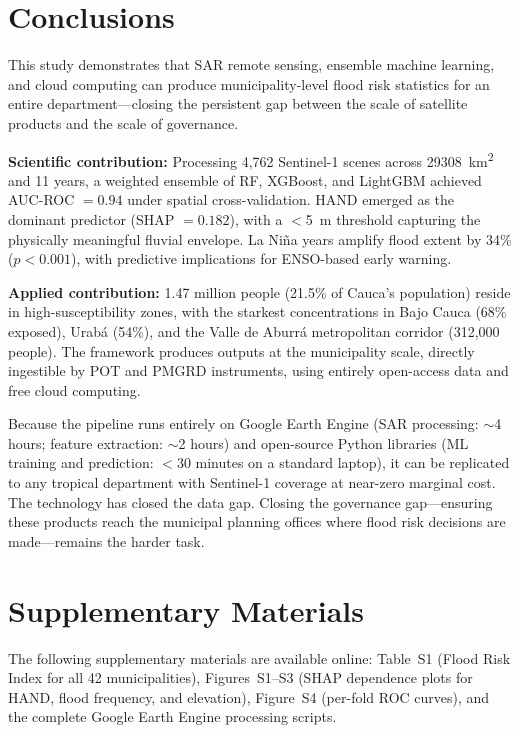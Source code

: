 \documentclass{article}
\begin{document}
\section{Conclusions}
\label{sec:conclusions}

This study demonstrates that SAR remote sensing, ensemble machine learning, and cloud computing can produce municipality-level flood risk statistics for an entire department---closing the persistent gap between the scale of satellite products and the scale of governance.

\textbf{Scientific contribution:} Processing 4,762 Sentinel-1 scenes across \SI{29308}{\kilo\metre\squared} and 11 years, a weighted ensemble of RF, XGBoost, and LightGBM achieved AUC-ROC $= 0.94$ under spatial cross-validation. HAND emerged as the dominant predictor (SHAP $= 0.182$), with a $<$\SI{5}{\metre} threshold capturing the physically meaningful fluvial envelope. La Ni\~na years amplify flood extent by 34\% ($p < 0.001$), with predictive implications for ENSO-based early warning.

\textbf{Applied contribution:} 1.47 million people (21.5\% of Cauca's population) reside in high-susceptibility zones, with the starkest concentrations in Bajo Cauca (68\% exposed), Urab\'a (54\%), and the Valle de Aburr\'a metropolitan corridor (312,000 people). The framework produces outputs at the municipality scale, directly ingestible by POT and PMGRD instruments, using entirely open-access data and free cloud computing.

Because the pipeline runs entirely on Google Earth Engine (SAR processing: $\sim$4 hours; feature extraction: $\sim$2 hours) and open-source Python libraries (ML training and prediction: $<$30 minutes on a standard laptop), it can be replicated to any tropical department with Sentinel-1 coverage at near-zero marginal cost. The technology has closed the data gap. Closing the governance gap---ensuring these products reach the municipal planning offices where flood risk decisions are made---remains the harder task.

\section*{Supplementary Materials}

The following supplementary materials are available online: Table~S1 (Flood Risk Index for all 42 municipalities), Figures~S1--S3 (SHAP dependence plots for HAND, flood frequency, and elevation), Figure~S4 (per-fold ROC curves), and the complete Google Earth Engine processing scripts.
\end{document}
